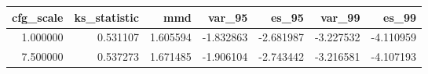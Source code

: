 \begin{tabular}{rrrrrrr}
\toprule
cfg_scale & ks_statistic & mmd & var_95 & es_95 & var_99 & es_99 \\
\midrule
1.000000 & 0.531107 & 1.605594 & -1.832863 & -2.681987 & -3.227532 & -4.110959 \\
7.500000 & 0.537273 & 1.671485 & -1.906104 & -2.743442 & -3.216581 & -4.107193 \\
\bottomrule
\end{tabular}
